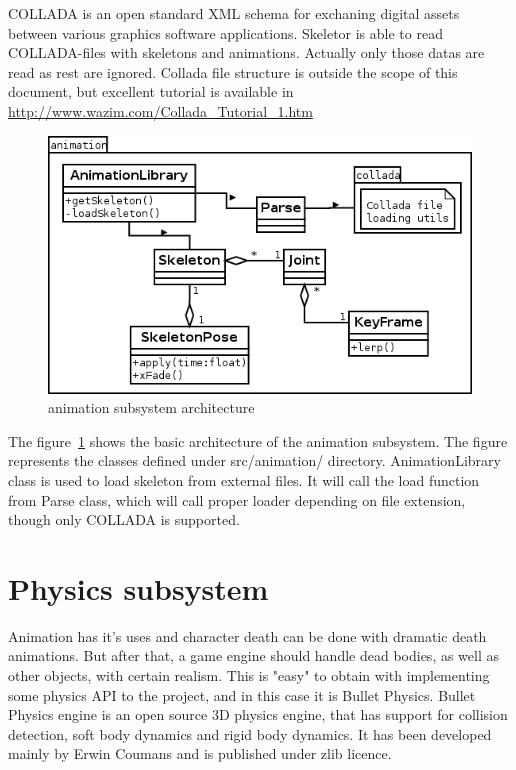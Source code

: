 \documentclass[11pt,twoside,a4paper]{article}
\begin{document}
COLLADA is an open standard XML schema for exchaning digital assets between various graphics software applications. Skeletor is able to read COLLADA-files with skeletons and animations. Actually only those datas are read as rest are ignored. Collada file structure is outside the scope of this document, but excellent tutorial is available in \url{http://www.wazim.com/Collada_Tutorial_1.htm}

\begin{figure}
  \centering
    \includegraphics[scale=0.7]{animation_subsystem.png}
  \caption{animation subsystem architecture}
  \label{animsubsys}
\end{figure}

The figure~\ref{animsubsys} shows the basic architecture of the animation subsystem. The figure represents the classes defined under src/animation/ directory. AnimationLibrary class is used to load skeleton from external files. It will call the load function from Parse class, which will call proper loader depending on file extension, though only COLLADA is supported.

\section{Physics subsystem}

Animation has it's uses and character death can be done with dramatic death animations. But after that, a game engine should handle dead bodies, as well as other objects, with certain realism. This is "easy" to obtain with implementing some physics API to the project, and in this case it is Bullet Physics. Bullet Physics engine is an open source 3D physics engine, that has support for collision detection, soft body dynamics and rigid body dynamics. It has been developed mainly by Erwin Coumans and is published under zlib licence.
\end{document}

